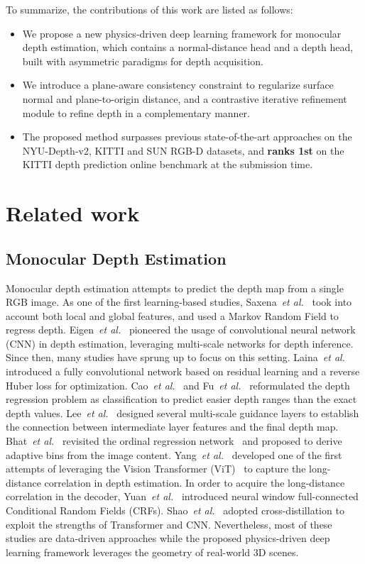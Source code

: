 \documentclass[10pt,twocolumn,letterpaper]{article}
\begin{document}
To summarize, the contributions of this work are listed as follows:
\begin{itemize}
	\item We propose a new physics-driven deep learning framework for monocular depth estimation, which contains a normal-distance head and a depth head, built with asymmetric paradigms for depth acquisition.
	
	\item We introduce a plane-aware consistency constraint to regularize surface normal and plane-to-origin distance, and a contrastive iterative refinement module to refine depth in a complementary manner.
	
	\item The proposed method surpasses previous state-of-the-art approaches on the NYU-Depth-v2, KITTI and SUN RGB-D datasets, and \textbf{ranks 1st} on the KITTI depth prediction online benchmark at the submission time. 
\end{itemize}

\section{Related work}
\subsection{Monocular Depth Estimation}
Monocular depth estimation attempts to predict the depth map from a single RGB image. As one of the first learning-based studies, Saxena~\textit{et al.}~\cite{saxena2005learning} took into account both local and global features, and used a Markov Random Field to regress depth. Eigen~\textit{et al.}~\cite{eigen2014depth} pioneered the usage of convolutional neural network (CNN) in depth estimation, leveraging multi-scale networks for depth inference. Since then, many studies have sprung up to focus on this setting. Laina~\textit{et al.}~\cite{laina2016deeper} introduced a fully convolutional network based on residual learning and a reverse Huber loss for optimization. Cao~\textit{et al.}~\cite{cao2017estimating} and Fu~\textit{et al.}~\cite{fu2018deep} reformulated the depth regression problem as classification to predict easier depth ranges than the exact depth values. Lee~\textit{et al.}~\cite{lee2019big} designed several multi-scale guidance layers to establish the connection between intermediate layer features and the final depth map. Bhat~\textit{et al.}~\cite{bhat2021adabins} revisited the ordinal regression network~\cite{fu2018deep} and proposed to derive adaptive bins from the image content. Yang~\textit{et al.}~\cite{yang2021transformer} developed one of the first attempts of leveraging the Vision Transformer (ViT)~\cite{dosovitskiy2020image} to capture the long-distance correlation in depth estimation. In order to acquire the long-distance correlation in the decoder, Yuan~\textit{et al.}~\cite{Yuan_2022_CVPR} introduced neural window full-connected Conditional Random Fields (CRFs). Shao~\textit{et al.}~\cite{shao2023urcdc} adopted cross-distillation to exploit the strengths of Transformer and CNN. Nevertheless, most of these studies are data-driven approaches while the proposed physics-driven deep learning framework leverages the geometry of real-world 3D scenes. 
\end{document}
